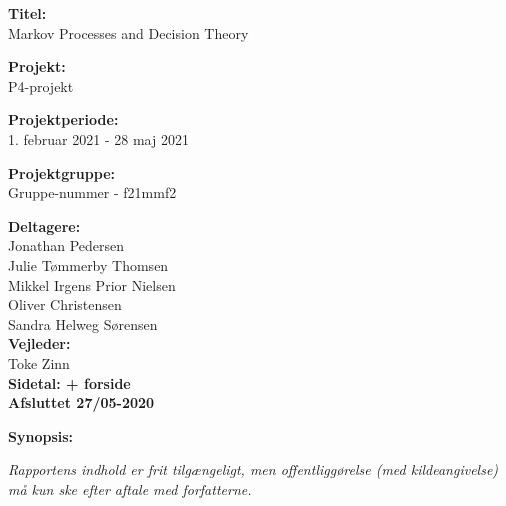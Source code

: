 \begin{minipage}[t]{0.48\textwidth}
\textbf{Titel:} \\[5pt]\hspace{2ex}
{Markov Processes and Decision Theory}
\bigskip

\textbf{Projekt:} \\[5pt]\hspace{2ex}
P4-projekt
\bigskip

\textbf{Projektperiode:} \\[5pt]\hspace{2ex}
1. februar 2021 - 28 maj 2021
\bigskip

\textbf{Projektgruppe:} \\[5pt]\hspace{2ex}
Gruppe-nummer - f21mmf2
\bigskip

\textbf{Deltagere:} \\[5pt]%
Jonathan Pedersen\\%
Julie Tømmerby Thomsen\\%
Mikkel Irgens Prior Nielsen \\%
Oliver Christensen\\%
Sandra Helweg Sørensen\\

\textbf{Vejleder:} \\[5pt]%
Toke Zinn \\

\textbf{Sidetal: \pageref{LastPage} + forside} \\ 
\textbf{Afsluttet 27/05-2020}

\end{minipage}
\hfill
\begin{minipage}[t]{0.5\textwidth}
\textbf{Synopsis:} \\[5pt]
\end{minipage}
\hspace*{2ex}

\vfill

{\footnotesize \textit{Rapportens indhold er frit tilgængeligt, men offentliggørelse (med kildeangivelse) må kun ske efter aftale med forfatterne.}}

\pagebreak
\phantom{a}
\thispagestyle{empty}